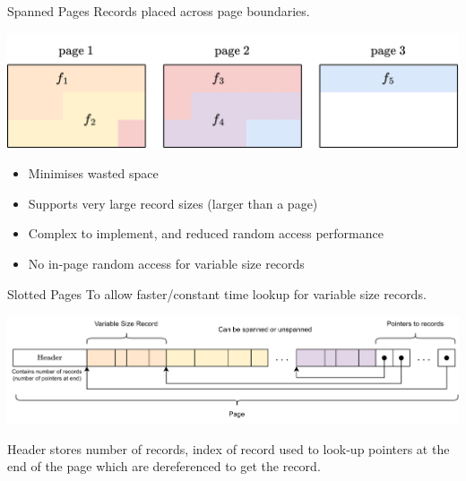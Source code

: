 \begin{definitionbox}{Spanned Pages}
    Records placed across page boundaries.
    \begin{center}
        \includegraphics[width=.8\textwidth]{storage/images/spanned_page.drawio.png}
    \end{center}
    \begin{itemize}
        \item Minimises wasted space
        \item Supports very large record sizes (larger than a page)
        \item Complex to implement, and reduced random access performance
        \item No in-page random access for variable size records
    \end{itemize}
\end{definitionbox}

\begin{definitionbox}{Slotted Pages}
    To allow faster/constant time lookup for variable size records.
    \begin{center}
        \includegraphics[width=.8\textwidth]{storage/images/slotted_pages.drawio.png}
    \end{center}
    Header stores number of records, index of record used to look-up pointers at the end of the page which are dereferenced to get the record.
\end{definitionbox}


